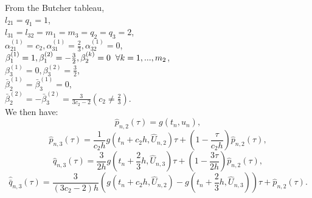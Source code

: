 \documentclass[12pt]{article}
\begin{document}
From the Butcher tableau, \\
$l_{21} = q_1 = 1$,\\
$l_{31} = l_{32} = m_1 = m_3 = q_2 = q_3 = 2$,\\
$\alpha_{21}^{(1)} = c_2 , \alpha_{31}^{(1)} = \frac{2}{3}, \alpha_{32}^{(1)} = 0$,\\
$\beta_1^{(1)} = 1, \beta_1^{(2)} = -\frac{3}{2}, \beta_2^{(k)} = 0 \hspace{.2cm} \forall k = 1,...,m_2$,\\
$\beta_3^{(1)} = 0, \beta_3^{(2)} = \frac{3}{2}$,\\ 
$\bar{\beta}_2^{(1)} = \bar{\beta}_3^{(1)} = 0$,\\
$\bar{\beta}_2^{(2)} = -\bar{\beta}_3^{(2)} = \frac{3}{3c_2 - 2} (c_2 \neq \frac{2}{3})$.\\

We then have:
\begin{equation}
\hat{p}_{n,2}(\tau) = g(t_n,\hat{u}_n), \tag{3.30a} \label{eq: 3.30a}
\end{equation}
\begin{equation}
\hat{p}_{n,3}(\tau) = \frac{1}{c_2h}g(t_n + c_2h,\hat{U}_{n,2})\tau + (1- \frac{\tau}{c_2h})\hat{p}_{n,2}(\tau), \tag{3.30b} \label{eq: 3.30b}
\end{equation}
 \begin{equation}
 \hat{q}_{n,3}(\tau) = \frac{3}{2h}g(t_n + \frac{2}{3}h, \hat{U}_{n,3}) \tau + (1 - \frac{3\tau}{2h})\hat{p}_{n,2}(\tau), \tag{3.30c} \label{eq: 3.30c}
 \end{equation}
 \begin{equation}
 \hat{\bar{q}}_{n,3}(\tau) = \frac{3}{(3c_2-2)h}(g(t_n + c_2h,\hat{U}_{n,2}) - g(t_n + \frac{2}{3}h, \hat{U}_{n,3}) )\tau + \hat{p}_{n,2}(\tau). \tag{3.30c} \label{eq: 3.30d}
 \end{equation}
 
\end{document}
